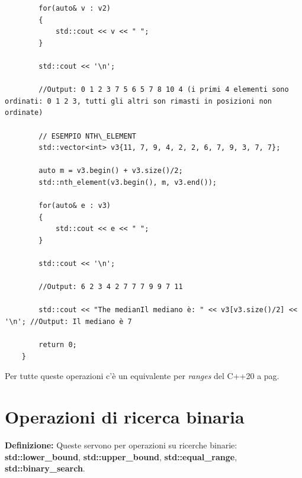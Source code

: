 \begin{lstlisting}
		for(auto& v : v2)
		{
			std::cout << v << " ";
		}
	
		std::cout << '\n';
		
		//Output: 0 1 2 3 7 5 6 5 7 8 10 4 (i primi 4 elementi sono ordinati: 0 1 2 3, tutti gli altri son rimasti in posizioni non ordinate)
		
		// ESEMPIO NTH\_ELEMENT
		std::vector<int> v3{11, 7, 9, 4, 2, 2, 6, 7, 9, 3, 7, 7};
		
		auto m = v3.begin() + v3.size()/2;
		std::nth_element(v3.begin(), m, v3.end());
		
		for(auto& e : v3)
		{
			std::cout << e << " ";
		}
		
		std::cout << '\n';
		
		//Output: 6 2 3 4 2 7 7 7 9 9 7 11
		
		std::cout << "The medianIl mediano è: " << v3[v3.size()/2] << '\n'; //Output: Il mediano è 7
		
		return 0;
	}
\end{lstlisting}

\fleuron

\textsf{\small Per tutte queste operazioni c'è un equivalente per \emph{ranges} del C++20 a pag. \pageref{ranges}} \\


\newpage

\section{Operazioni di ricerca binaria}

\textsf{\small \textbf{Definizione: } Queste servono per operazioni su ricerche binarie: \textbf{std::lower\_bound}, \textbf{std::upper\_bound}, \textbf{std::equal\_range}, \textbf{std::binary\_search}.} \\

